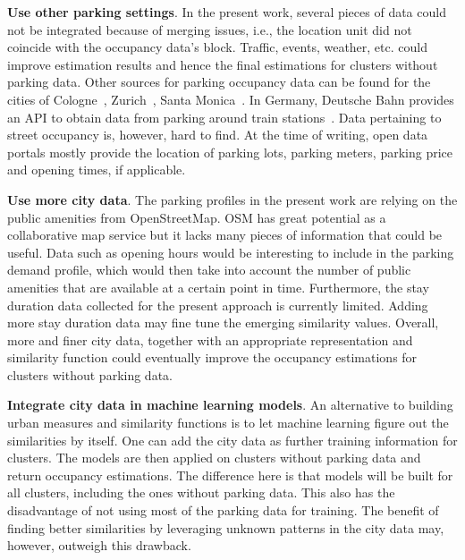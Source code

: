 \begin{romanlist}
	\item \textbf{Use other parking settings}.
	In the present work, several pieces of data could not be integrated because of merging issues, i.e., the location unit did not coincide with the occupancy data's block.
	Traffic, events, weather, etc. could improve estimation results and hence the final estimations for clusters without parking data.
	Other sources for parking occupancy data can be found for the cities of Cologne~\cite{cologne_data}, Zurich~\cite{zurich_data}, Santa Monica~\cite{santa_monica_data}.
	In Germany, Deutsche Bahn provides an API to obtain data from parking around train stations~\cite{dbbahn_data}.
	Data pertaining to street occupancy is, however, hard to find.
	At the time of writing, open data portals mostly provide the location of parking lots, parking meters, parking price and opening times, if applicable.  
	
	\item \textbf{Use more city data}.
	The parking profiles in the present work are relying on the public amenities from OpenStreetMap.
	OSM has great potential as a collaborative map service but it lacks many pieces of information that could be useful.
	Data such as opening hours would be interesting to include in the parking demand profile, which would then take into account the number of public amenities that are available at a certain point in time.
	Furthermore, the stay duration data collected for the present approach is currently limited.
	Adding more stay duration data may fine tune the emerging similarity values.
	Overall, more and finer city data, together with an appropriate representation and similarity function could eventually improve the occupancy estimations for clusters without parking data. 
	
	\item \textbf{Integrate city data in machine learning models}.
	An alternative to building urban measures and similarity functions is to let machine learning figure out the similarities by itself.
	One can add the city data as further training information for clusters.
	The models are then applied on clusters without parking data and return occupancy estimations.
	The difference here is that models will be built for all clusters, including the ones without parking data.
	This also has the disadvantage of not using most of the parking data for training.
	The benefit of finding better similarities by leveraging unknown patterns in the city data may, however, outweigh this drawback. 
	

\end{romanlist}
